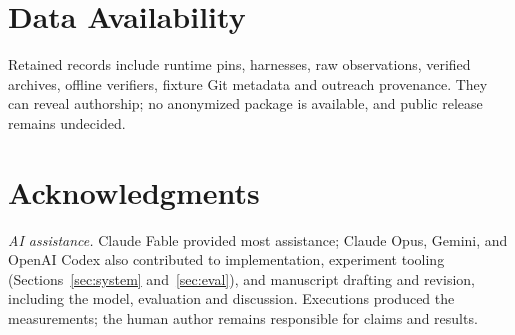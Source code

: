 \section*{Data Availability}
Retained records include runtime pins, harnesses, raw observations, verified
archives, offline verifiers, fixture Git metadata and outreach provenance.
They can reveal authorship; no anonymized package is available, and public
release remains undecided.

\section*{Acknowledgments}
\noindent\textit{AI assistance.}
Claude Fable provided most assistance; Claude Opus, Gemini, and OpenAI Codex
also contributed to implementation, experiment tooling
(Sections~\ref{sec:system} and~\ref{sec:eval}), and manuscript drafting and
revision, including the model, evaluation and discussion. Executions produced
the measurements; the human author remains responsible for claims and results.
